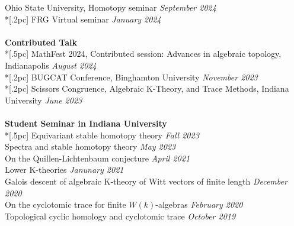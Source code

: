 \documentclass{article}
\begin{document}
{ Ohio State University, Homotopy seminar} \hfill {\it September 2024\/}  \\*[.2pc]
{ FRG Virtual seminar} \hfill {\it January 2024\/}  \\
\\
{\bf \large Contributed Talk} \\*[.5pc]
{MathFest 2024, Contributed session: Advances in algebraic topology, Indianapolis} \hfill {\it August 2024\/}  \\*[.2pc]
{BUGCAT Conference, Binghamton University} \hfill {\it November 2023\/}  \\*[.2pc]
{Scissors Congruence, Algebraic K-Theory, and Trace Methods, Indiana University} \hfill {\it June 2023\/}  \\
\\
{\bf \large Student Seminar in Indiana University} \\*[.5pc]
{Equivariant stable homotopy theory} \hfill {\it Fall 2023\/} \\
{Spectra and stable homotopy theory} \hfill {\it May 2023\/} \\
{On the Quillen-Lichtenbaum conjecture} \hfill {\it April 2021\/} \\
{Lower K-theories} \hfill {\it Janunary 2021\/} \\
{Galois descent of algebraic K-theory of Witt vectors of finite length} \hfill {\it December 2020\/} \\
{On the cyclotomic trace for finite $W(k)$-algebras} \hfill {\it February 2020\/} \\
{Topological cyclic homology and cyclotomic trace} \hfill {\it October 2019\/} \\
\end{document}
